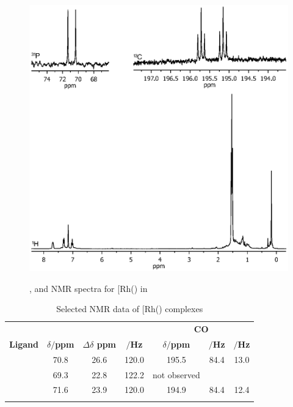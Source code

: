 \begin{figure}[htbp]
\begin{center}
\vspace{0.5cm}
\includegraphics[trim = 2.5cm 7.2cm 2.5cm 5.0cm, clip]{../NMR/7017.eps}
\caption[\phosphorus, \carbon{} and \proton{} NMR spectra for [Rh(\tBuxantphos)(CO)2Cl]{\phosphorus, \carbon{} and \proton{} NMR spectra for [Rh(\tBuxantphos)\ce{(CO)2Cl]} in }
\vspace{0.2cm}
\label{Rhcarbonylnmr}
\end{center}
\end{figure}
\vspace{0.2cm}

\begin{table}[htbp]
\caption[Selected NMR data of [Rh(\tBuxantphos)\ce{(CO)2Cl}{]} complexes]{Selected NMR data of [Rh(\tBuxantphos)\ce{(CO)2Cl]} complexes}
\vspace{1em}
\label{table:rhodiumcarbonyl}
\small
\begin{center}
\begin{tabular}{ c c c c c c c}
	\toprule{}
	~ & \multicolumn{3}{c}{\bfseries{\phosphorus}} & \multicolumn{3}{c}{\bfseries{\carbon{} CO}} \\
	\cmidrule(lr){2-4} \cmidrule(lr){5-7}
	\bfseries{Ligand}&\bfseries{$\delta/$ppm}&\bfseries{$\Delta\delta$ ppm}&\bfseries{\JRhP{}$/$Hz}&\bfseries{$\delta/$ppm}&\bfseries{\JRhC $/$Hz}&\bfseries{\JPC $/$Hz}\\
	\midrule{}
	\tBusixantphos	&	70.8	&	26.6 & 120.0	&	195.5	& 84.4	& 13.0\\
	\tButhixantphos	& 	69.3	&	22.8	& 122.2	&	not observed	& 	& \\
	\tBuxantphos	&	71.6	&	23.9	& 120.0	&	194.9	& 84.4	& 12.4\\
	\bottomrule{}
\end{tabular}
\end{center}
\end{table}

